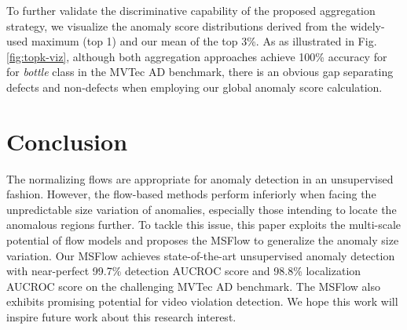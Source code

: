 \documentclass[lettersize,journal]{IEEEtran}
\begin{document}
To further validate the discriminative capability of the proposed aggregation strategy, we visualize the anomaly score distributions derived from the widely-used maximum (top 1) and our mean of the top 3\%. As as illustrated in Fig. \ref{fig:topk-viz}, although both aggregation approaches achieve 100\% accuracy for for \textit{bottle} class in the MVTec AD benchmark, there is an obvious gap separating defects and non-defects when employing our global anomaly score calculation.

\section{Conclusion} \label{sec:conclusion}
The normalizing flows are appropriate for anomaly detection in an unsupervised fashion. However, the flow-based methods perform inferiorly when facing the unpredictable size variation of anomalies, especially those intending to locate the anomalous regions further. To tackle this issue, this paper exploits the multi-scale potential of flow models and proposes the MSFlow to generalize the anomaly size variation. Our MSFlow achieves state-of-the-art unsupervised anomaly detection with near-perfect 99.7\% detection AUCROC score and 98.8\% localization AUCROC score on the challenging MVTec AD benchmark. The MSFlow also exhibits promising potential for video violation detection. We hope this work will inspire future work about this research interest.



\end{document}
